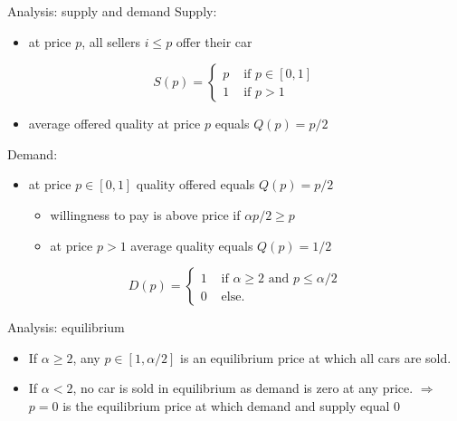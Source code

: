 \documentclass[bigger]{beamer}
\newcommand{\Ra}{\Rightarrow} \newcommand{\ra}{\rightarrow} \newcommand{\Lra}{\Leftrightarrow}
\begin{document}
\begin{frame}[label={sec:orgf1e9dec}]{Analysis: supply and demand}
\alert{Supply:}
\begin{itemize}
\item at price \(p\), all sellers \(i\leq p\) offer their car
\end{itemize}
$$S(p)=\begin{cases}p&\text{ if }p\in[0,1]\\1&\text{ if }p>1\end{cases}$$ 
\begin{itemize}
\item average offered quality at price \(p\) equals \(Q(p)=p/2\)
\end{itemize}


\alert{Demand:}
\begin{itemize}
\item at price \(p\in[0,1]\) quality offered equals \(Q(p)=p/2\)
\begin{itemize}
\item willingness to pay is above price if \(\alpha p/2\geq p\)
\item at price \(p>1\) average quality equals \(Q(p)=1/2\)
\end{itemize}
\end{itemize}
\begin{equation*}
D(p) = \begin{cases}1 & \text{ if }\alpha \geq 2 \text{ and }p\leq \alpha/2\\ 0 & \text{ else. } \end{cases}
\end{equation*}
\end{frame}

\begin{frame}[label={sec:orgf364451}]{Analysis: equilibrium}
\begin{itemize}
\item If \(\alpha\geq 2\), any \(p\in[1,\alpha/2]\) is an equilibrium price at which all cars are sold.
\item If \(\alpha<2\), no car is sold in equilibrium as demand is zero at any price. \linebreak
\(\Ra\) \(p=0\) is the equilibrium price at which demand and supply equal 0
\end{itemize}
\end{frame}
\end{document}
